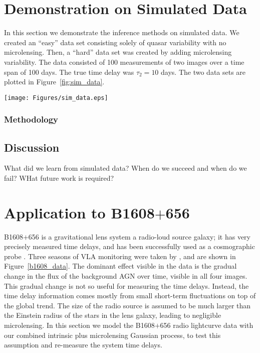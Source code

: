 \documentclass[useAMS,usenatbib, a4paper]{mn2e} \usepackage{natbib}
\begin{document}
\section{Demonstration on Simulated Data}
In this section we demonstrate the inference methods on simulated data. We
created an ``easy'' data set consisting solely of quasar variability with no
microlensing. Then, a ``hard'' data set was created by adding microlensing
variability. The data consisted of 100 measurements of two images over a time
span of 100 days. The true time delay was $\tau_2 = 10$ days. The two data
sets are plotted in Figure~\ref{fig:sim_data}.

\begin{figure*}
\texttt{[image: Figures/sim\_data.eps]}
\caption{\label{fig:sim_data}}
\end{figure*}



\subsubsection{Methodology}
\subsection{Discussion}

What did we learn from simulated data?
When do we succeed and when do we fail?
WHat future work is required?


\section{Application to B1608$+$656}

B1608$+$656 is a gravitational lens system a radio-loud source galaxy; it has 
very precisely measured time delays, and has been successfully used as a
cosmographic probe \citep[e.g.][]{Suy++10}.  Three seasons of VLA monitoring
were taken by  \citet{2002ApJ...581..823F, 1999ApJ...527..498F},  and are
shown in Figure~\ref{b1608_data}. The dominant effect visible in the data is
the gradual change in the flux of the background AGN over time, visible in all
four images. This gradual change is not so useful for measuring the time
delays. Instead, the time delay information comes mostly from small short-term
fluctuations on top of the global trend. The size of the radio source is
assumed to be much larger than the Einstein radius of the stars in the lens
galaxy, leading to negligible microlensing. In this section we model the
B1608$+$656 radio lightcurve data with our combined intrinsic plus
microlensing Gaussian process, to test this assumption and re-measure the
system time delays.
\end{document}
